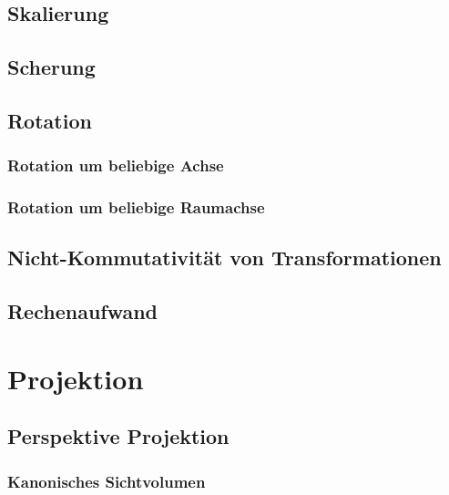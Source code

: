 \documentclass[a4paper, 11pt, accentcolor = tud3b]{tudreport}
\begin{document}
			\subsection{Skalierung} %

			\subsection{Scherung} %

			\subsection{Rotation} %

				\subsubsection{Rotation um beliebige Achse} %

				\subsubsection{Rotation um beliebige Raumachse} %

			\subsection{Nicht-Kommutativität von Transformationen} %

			\subsection{Rechenaufwand} %

		\section{Projektion} %

			\subsection{Perspektive Projektion} %

				\subsubsection{Kanonisches Sichtvolumen} %
\end{document}
